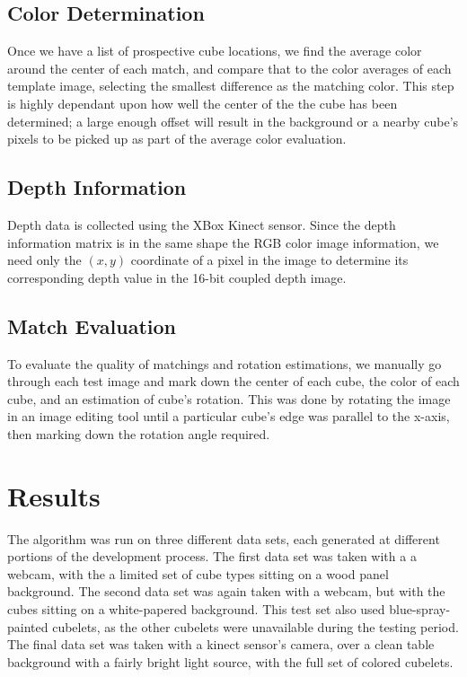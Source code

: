 \documentclass[conference]{IEEEtran}
\begin{document}
\subsection{Color Determination}
Once we have a list of prospective cube locations, we find the average color around the center of each match, and compare that to the color averages of each template image, selecting the smallest difference as the matching color.  This step is highly dependant upon how well the center of the the cube has been determined; a large enough offset will result in the background or a nearby cube's pixels to be picked up as part of the average color evaluation.

\subsection{Depth Information}
Depth data is collected using the XBox Kinect sensor.  Since the depth information matrix is in the same shape the RGB color image information, we need only the $(x,y)$ coordinate of a pixel in the image to determine its corresponding depth value in the 16-bit coupled depth image.

\subsection{Match Evaluation}
To evaluate the quality of matchings and rotation estimations, we manually go through each test image and mark down the center of each cube, the color of each cube, and an estimation of cube's rotation. This was done by rotating the image in an image editing tool until a particular cube's edge was parallel to the x-axis, then marking down the rotation angle required.\\

\section{Results}
The algorithm was run on three different data sets, each generated at different portions of the development process.  The first data set was taken with a a webcam, with the a limited set of cube types sitting on a wood panel background.  The second data set was again taken with a webcam, but with the cubes sitting on a white-papered background.  This test set also used blue-spray-painted cubelets, as the other cubelets were unavailable during the testing period. The final data set was taken with a kinect sensor's camera, over a clean table background with a fairly bright light source, with the full set of colored cubelets.
\end{document}
